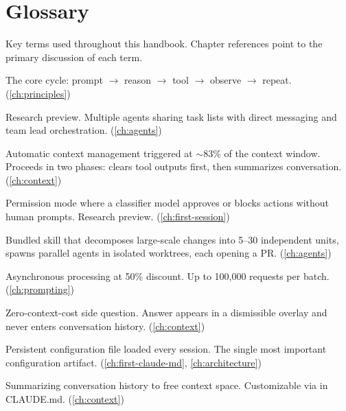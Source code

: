 \chapter{Glossary}
\label{app:glossary}

Key terms used throughout this handbook.
Chapter references point to the primary discussion of each term.

\begin{description}[style=nextline, leftmargin=2cm]

  \item[Agent loop]
    The core cycle: prompt $\rightarrow$ reason $\rightarrow$ tool $\rightarrow$ observe $\rightarrow$ repeat.
    (\cref{ch:principles})

  \item[Agent Teams]
    Research preview. Multiple agents sharing task lists with direct messaging
    and team lead orchestration. (\cref{ch:agents})

  \item[Auto-compaction]
    Automatic context management triggered at $\sim$83\% of the context window.
    Proceeds in two phases: clears tool outputs first, then summarizes conversation.
    (\cref{ch:context})

  \item[Auto mode]
    Permission mode where a classifier model approves or blocks actions
    without human prompts. Research preview. (\cref{ch:first-session})

  \item[\code{/batch}]
    Bundled skill that decomposes large-scale changes into 5--30 independent units,
    spawns parallel agents in isolated worktrees, each opening a PR.
    (\cref{ch:agents})

  \item[Batch API]
    Asynchronous processing at 50\% discount. Up to 100,000 requests per batch.
    (\cref{ch:prompting})

  \item[\code{/btw}]
    Zero-context-cost side question. Answer appears in a dismissible overlay
    and never enters conversation history. (\cref{ch:context})

  \item[CLAUDE.md]
    Persistent configuration file loaded every session. The single most important
    configuration artifact. (\cref{ch:first-claude-md}, \cref{ch:architecture})

  \item[Compaction]
    Summarizing conversation history to free context space.
    Customizable via  in CLAUDE.md. (\cref{ch:context})


\end{description}
